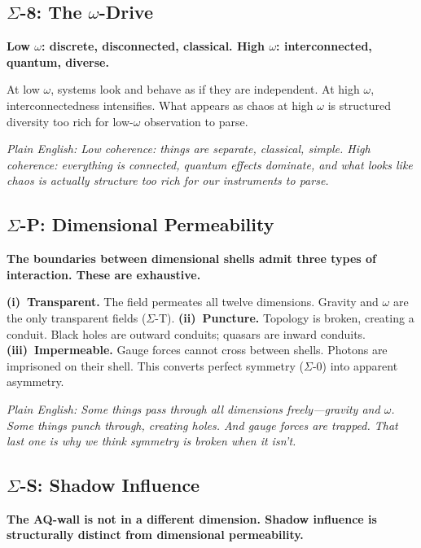 \subsection*{$\Sigma$-8: The $\omega$-Drive}
\par\smallskip
\textbf{Low $\omega$: discrete, disconnected, classical.  High $\omega$: interconnected, quantum, diverse.}

At low $\omega$, systems look and behave as if they are independent.  At high $\omega$, interconnectedness intensifies.  What appears as chaos at high $\omega$ is structured diversity too rich for low-$\omega$ observation to parse.

\emph{Plain English: Low coherence: things are separate, classical, simple.  High coherence: everything is connected, quantum effects dominate, and what looks like chaos is actually structure too rich for our instruments to parse.}

\subsection*{$\Sigma$-P: Dimensional Permeability}
\par\smallskip
\textbf{The boundaries between dimensional shells admit three types of interaction.  These are exhaustive.}

\textbf{(i)~Transparent.}  The field permeates all twelve dimensions.  Gravity and $\omega$ are the only transparent fields ($\Sigma$-T).  \textbf{(ii)~Puncture.}  Topology is broken, creating a conduit.  Black holes are outward conduits; quasars are inward conduits.  \textbf{(iii)~Impermeable.}  Gauge forces cannot cross between shells.  Photons are imprisoned on their shell.  This converts perfect symmetry ($\Sigma$-0) into apparent asymmetry.

\emph{Plain English: Some things pass through all dimensions freely---gravity and $\omega$.  Some things punch through, creating holes.  And gauge forces are trapped.  That last one is why we think symmetry is broken when it isn't.}

\subsection*{$\Sigma$-S: Shadow Influence}
\par\smallskip
\textbf{The AQ-wall is not in a different dimension.  Shadow influence is structurally distinct from dimensional permeability.}

